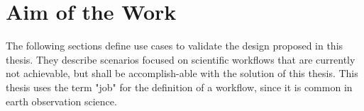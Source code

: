 \documentclass[draft,final]{vutinfth} %
\begin{document}

\section{Aim of the Work}\label{Aim}\label{Use Cases}

The following sections define use cases to validate the design proposed in this thesis. They describe scenarios focused on scientific workflows that are currently not achievable, but shall be accomplish-able with the solution of this thesis. This thesis uses the term "job" for the definition of a workflow, since it is common in earth observation science.
\end{document}

